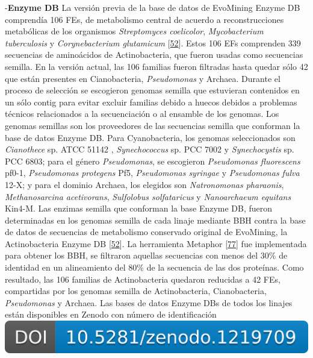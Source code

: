 \documentclass[12pt,twoside]{reedthesis}
\begin{document}
  -\textbf{Enzyme DB} La versión previa de la base de datos de EvoMining
  Enzyme DB comprendía 106 FEs, de metabolismo central de acuerdo a
  reconstrucciones metabólicas de los organismos \emph{Streptomyces
  coelicolor}, \emph{Mycobacterium tuberculosis} y \emph{Corynebacterium
  glutamicum}
  {[}\protect\hyperlink{ref-cruz-morales_phylogenomic_2016}{52}{]}. Estos
  106 EFs comprenden 339 secuencias de aminoácidos de Actinobacteria, que
  fueron usadas como secuencias semilla. En la versión actual, las 106
  familias fueron filtradas hasta quedar sólo 42 que están presentes en
  Cianobacteria, \emph{Pseudomonas} y Archaea. Durante el proceso de
  selección se escogieron genomas semilla que estuvieran contenidos en un
  sólo contig para evitar excluir familias debido a huecos debidos a
  problemas técnicos relacionados a la secuenciación o al ensamble de los
  genomas. Los genomas semillas son los proveedores de las secuencias
  semilla que conforman la base de datos Enzyme DB. Para Cyanobacteria,
  los genomas seleccionados son \emph{Cianothece} sp. ATCC 51142 ,
  \emph{Synechococcus} sp. PCC 7002 y \emph{Synechocystis} sp. PCC 6803;
  para el género \emph{Pseudomonas}, se escogieron \emph{Pseudomonas
  fluorescens} pf0-1, \emph{Pseudomonas protegens} Pf5, \emph{Pseudomonas
  syringae} y \emph{Pseudomonas fulva} 12-X; y para el dominio Archaea,
  los elegidos son \emph{Natronomonas pharaonis}, \emph{Methanosarcina
  acetivorans}, \emph{Sulfolobus solfataricus} y \emph{Nanoarchaeum
  equitans} Kin4-M. Las enzimas semilla que conforman la base Enzyme DB,
  fueron determinadas en los genomas semilla de cada linaje mediante BBH
  contra la base de datos de secuencias de metabolismo conservado original
  de EvoMining, la Actinobacteria Enzyme DB
  {[}\protect\hyperlink{ref-cruz-morales_phylogenomic_2016}{52}{]}. La
  herramienta Metaphor
  {[}\protect\hyperlink{ref-van_der_veen_metaphor_2014}{77}{]} fue
  implementada para obtener los BBH, se filtraron aquellas secuencias con
  menos del \(30\%\) de identidad en un alineamiento del \(80\%\) de la
  secuencia de las dos proteínas. Como resultado, las 106 familias de
  Actinobacteria quedaron reducidas a 42 FEs, compartidas por los genomas
  semilla de Actinobacteria, Cianobacteria, \emph{Pseudomonas} y Archaea.
  Las bases de datos Enzyme DBs de todos los linajes están disponibles en
  Zenodo con número de identificación
  \href{https://doi.org/10.5281/zenodo.1219709}{\includegraphics{chapter2/zenodo_1219709.png}}
  
\end{document}
